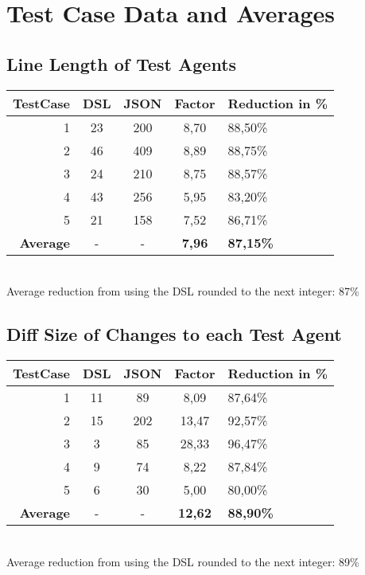 \chapter{Test Case Data and Averages}
\label{ResultTables}

\section{Line Length of Test Agents}
\begin{tabular}{r|c|c|c|l}
    \textbf{TestCase} & \textbf{DSL} & \textbf{JSON} & \textbf{Factor} & \textbf{Reduction in \%} \\\hline
    1 & 23 & 200 & 8,70 & 88,50\% \\
    2 & 46 & 409 & 8,89 & 88,75\% \\
    3 & 24 & 210 & 8,75 & 88,57\% \\
    4 & 43 & 256 & 5,95 & 83,20\% \\
    5 & 21 & 158 & 7,52 & 86,71\% \\\hline
    \textbf{Average} & - & - & \textbf{7,96} & \textbf{87,15\%} \\
\end{tabular}\\
Average reduction from using the DSL rounded to the next integer: 87\%
    

\section{Diff Size of Changes to each Test Agent}
\begin{tabular}{r|c|c|c|l}
    \textbf{TestCase} & \textbf{DSL} & \textbf{JSON} & \textbf{Factor} & \textbf{Reduction in \%} \\\hline
    1 & 11 & 89 & 8,09 & 87,64\% \\
    2 & 15 & 202 & 13,47 & 92,57\% \\
    3 & 3 & 85 & 28,33 & 96,47\% \\
    4 & 9 & 74 & 8,22 & 87,84\% \\
    5 & 6 & 30 & 5,00 & 80,00\% \\\hline
    \textbf{Average} & - & - & \textbf{12,62} & \textbf{88,90\%} \\
\end{tabular}\\
Average reduction from using the DSL rounded to the next integer: 89\%